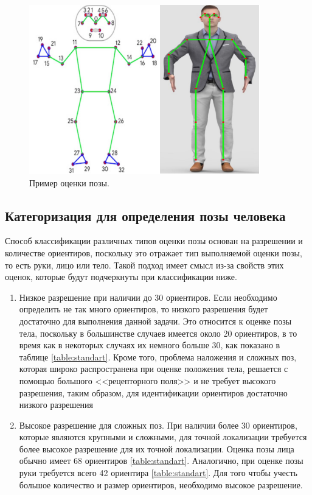 \begin{figure}[ht!]
	\centering
	\includegraphics[width=0.6\linewidth]{assets/img-std.png}
	\caption{Пример оценки позы.}
	\label{img:std}
\end{figure}

\subsection{Категоризация для определения позы человека}

Способ классификации различных типов оценки позы основан на разрешении и количестве ориентиров, поскольку это отражает тип выполняемой оценки позы, то есть руки, лицо или тело.
Такой подход имеет смысл из-за свойств этих оценок, которые будут подчеркнуты при классификации ниже.

\begin{enumerate}[label=\arabic*)]

\item Низкое разрешение при наличии до 30 ориентиров. Если необходимо определить не так много ориентиров, то низкого разрешения будет достаточно для выполнения данной задачи. 
Это относится к оценке позы тела, поскольку в большинстве случаев имеется около 20 ориентиров, в то время как в некоторых случаях их немного больше 30, как показано в таблице \ref{table:standart}.
Кроме того, проблема наложения и сложных поз, которая широко распространена при оценке положения тела, решается с помощью большого <<рецепторного поля>> и не требует высокого разрешения, таким образом, для идентификации ориентиров достаточно низкого разрешения

\item Высокое разрешение для сложных поз.
При наличии более 30 ориентиров, которые являются крупными и сложными, для точной локализации требуется более высокое разрешение для их точной локализации.
Оценка позы лица обычно имеет 68 ориентиров \ref{table:standart}. Аналогично, при оценке позы руки требуется всего 42 ориентира \ref{table:standart}. Для того чтобы учесть большое количество и размер ориентиров, необходимо высокое разрешение.  

\end{enumerate}

